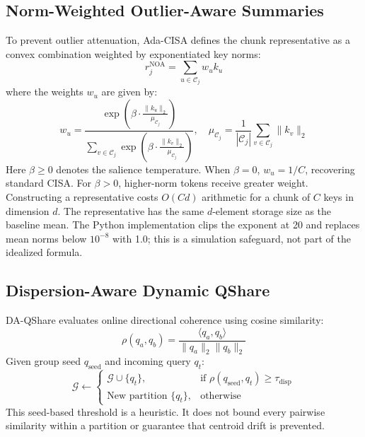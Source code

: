 \documentclass[10pt,twocolumn]{article}
\begin{document}
\subsection{Norm-Weighted Outlier-Aware Summaries}
To prevent outlier attenuation, Ada-CISA defines the chunk representative as a convex combination weighted by exponentiated key norms:
\begin{equation}
r_j^{\text{NOA}} = \sum_{u \in \mathcal{C}_j} w_u k_u
\end{equation}
where the weights $w_u$ are given by:
\begin{equation}
w_u = \frac{\exp\left( \beta \cdot \frac{\|k_u\|_2}{\mu_{\mathcal{C}_j}} \right)}{\sum_{v \in \mathcal{C}_j} \exp\left( \beta \cdot \frac{\|k_v\|_2}{\mu_{\mathcal{C}_j}} \right)}, \quad \mu_{\mathcal{C}_j} = \frac{1}{|\mathcal{C}_j|} \sum_{v \in \mathcal{C}_j} \|k_v\|_2
\end{equation}
Here $\beta \ge 0$ denotes the salience temperature. When $\beta = 0$, $w_u = 1/C$, recovering standard CISA. For $\beta > 0$, higher-norm tokens receive greater weight. Constructing a representative costs $O(Cd)$ arithmetic for a chunk of $C$ keys in dimension $d$. The representative has the same $d$-element storage size as the baseline mean. The Python implementation clips the exponent at 20 and replaces mean norms below $10^{-8}$ with 1.0; this is a simulation safeguard, not part of the idealized formula.

\subsection{Dispersion-Aware Dynamic QShare}
DA-QShare evaluates online directional coherence using cosine similarity:
\begin{equation}
\rho(q_a, q_b) = \frac{\langle q_a, q_b \rangle}{\|q_a\|_2 \|q_b\|_2}
\end{equation}
Given group seed $q_{\text{seed}}$ and incoming query $q_t$:
\begin{equation}
\mathcal{G} \leftarrow \begin{cases} 
\mathcal{G} \cup \{q_t\}, & \text{if } \rho(q_{\text{seed}}, q_t) \ge \tau_{\text{disp}} \\
\text{New partition } \{q_t\}, & \text{otherwise}
\end{cases}
\end{equation}
This seed-based threshold is a heuristic. It does not bound every pairwise similarity within a partition or guarantee that centroid drift is prevented.
\end{document}
